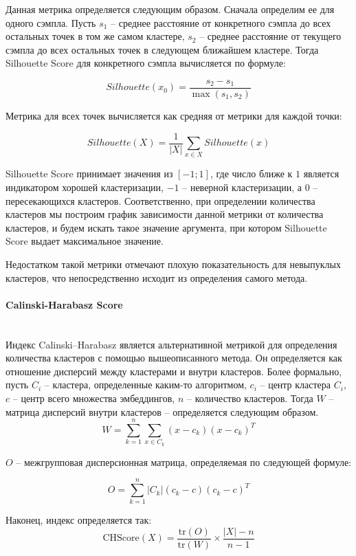 Данная метрика определяется следующим образом. Сначала определим ее для одного сэмпла. Пусть $s_1$ -- среднее расстояние от конкретного сэмпла до всех остальных точек в том же самом кластере, $s_2$ -- среднее расстояние от текущего сэмпла до всех остальных точек в следующем ближайшем кластере. Тогда Silhouette Score для конкретного сэмпла вычисляется по формуле:

$$
    Silhouette(x_0) = \frac{s_2 - s_1}{\max(s_1, s_2)}
$$
\smallskip

Метрика для всех точек вычисляется как средняя от метрики для каждой точки:

$$
    Silhouette(X) = \frac{1}{|X|} \sum_{x \in X} Silhouette(x)
$$
\smallskip

Silhouette Score принимает значения из $[-1; 1]$, где число ближе к $1$ является индикатором хорошей кластеризации, $-1$ -- неверной кластеризации, а $0$ -- пересекающихся кластеров. Соответственно, при определении количества кластеров мы построим график зависимости данной метрики от количества кластеров, и будем искать такое значение аргумента, при котором Silhouette Score выдает максимальное значение.

Недостатком такой метрики отмечают плохую показательность для невыпуклых кластеров, что непосредственно исходит из определения самого метода.

\paragraph{Calinski-Harabasz Score}\mbox{} \\

Индекс Calinski–Harabasz является альтернативной метрикой для определения количества кластеров с помощью вышеописанного метода. Он определяется как отношение дисперсий между кластерами и внутри кластеров. Более формально, пусть $C_i$ -- кластера, определенные каким-то алгоритмом, $c_i$ -- центр кластера $C_i$, $c$ -- центр всего множества эмбеддингов, $n$ -- количество кластеров. Тогда $W$ -- матрица дисперсий внутри кластеров -- определяется следующим образом.
$$
W = \sum_{k = 1}^{n} \sum_{x \in C_k} (x - c_k)(x - c_k)^T
$$

\bigskip
\noindent
$O$ -- межгрупповая дисперсионная матрица, определяемая по следующей формуле:

$$
O = \sum_{k = 1}^n |C_k|(c_k - c)(c_k - c)^T
$$

\smallskip
\noindent

Наконец, индекс определяется так:
$$
\text{CHScore}(X) = \frac{\text{tr}(O)}{\text{tr}(W)} \times \frac{|X| - n}{n - 1}
$$

